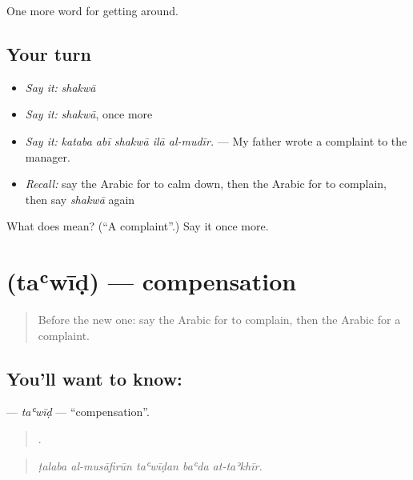 \begin{grammarlens}[title={What you've built}]
One more word for getting around.
\end{grammarlens}

\subsection*{Your turn}
\begin{itemize}
\raggedright
  \item \emph{Say it:} \emph{shakwā}
  \item \emph{Say it:} \emph{shakwā}, once more
  \item \emph{Say it:} \emph{kataba abī shakwā ilā al-mudīr.} — My father wrote a complaint to the manager.
  \item \emph{Recall:} say the Arabic for to calm down, then the Arabic for to complain, then say \emph{shakwā} again
\end{itemize}

\begin{tcolorbox}[breakable,colback=teal!4,colframe=teal!35!black,title={Before you move on}]
What does  mean? (\textquotedblleft{}A complaint\textquotedblright{}.) Say it once more.
\end{tcolorbox}
\section[\texorpdfstring{\ar{تعويض} (taʿwīḍ)}{تعويض (taʿwīḍ)}]{ (taʿwīḍ) — compensation}

\label{lesson:AR-C449-tawid}



\begin{quote}
Before the new one: say the Arabic for to complain, then the Arabic for a complaint.
\end{quote}

\subsection*{You'll want to know: }
\textbf{} — \emph{taʿwīḍ} — \textquotedblleft{}compensation\textquotedblright{}.

\begin{quote}
    .
\end{quote}

\begin{quote}
\emph{ṭalaba al-musāfirūn taʿwīḍan baʿda at-taʾkhīr.}
\end{quote}

